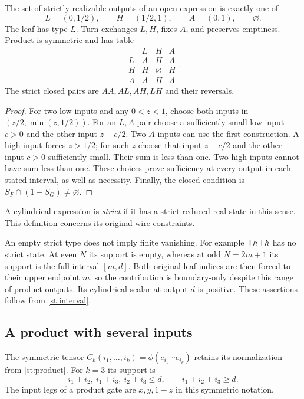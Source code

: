 \begin{lemma}\label{st:types}
The set of strictly realizable outputs of an open expression is
exactly one of
\[
 L=(0,1/2),\qquad H=(1/2,1),\qquad A=(0,1),\qquad\varnothing.
\]
The leaf has type $L$. Turn exchanges $L,H$, fixes $A$, and
preserves emptiness. Product is symmetric and has table
\[
 \begin{array}{c|ccc}
  &L&H&A\\\hline
 L&A&H&A\\
 H&H&\varnothing&H\\
 A&A&H&A
 \end{array}.
\]
The strict closed pairs are $AA,AL,AH,LH$ and their reversals.
\end{lemma}
\begin{proof}
For two low inputs and any $0<z<1$, choose both inputs in
$(z/2,\min(z,1/2))$. For an $L,A$ pair choose a sufficiently
small low input $c>0$ and the other input $z-c/2$.
Two $A$ inputs can use the first construction. A high input
forces $z>1/2$; for such $z$ choose that input $z-c/2$ and
the other input $c>0$ sufficiently small. Their sum is less
than one. Two high inputs cannot have sum less than one.
These choices prove sufficiency at every output in each stated
interval, as well as necessity. Finally, the closed condition is
$S_F\cap(1-S_G)\ne\varnothing$.
\end{proof}
\begin{definition}\label{st:strict-definition}
A cylindrical expression is \emph{strict} if it has a strict
reduced real state in this sense. This definition concerns its
original wire constraints.
\end{definition}
An empty strict type does not imply finite vanishing.
For example $\mathsf T h\,\mathsf T h$ has no strict state. At even $N$ its
support is empty, whereas at odd $N=2m+1$ its support
is the full interval $[m,d]$. Both original leaf
indices are then forced to their upper endpoint $m$,
so the contribution is boundary-only despite this
range of product outputs. Its cylindrical scalar
at output $d$ is positive. These assertions follow
from \eqref{st:interval}.

\subsection{A product with several inputs}
The symmetric tensor
$C_k(i_1,\ldots,i_k)=\phi(e_{i_1}\cdots e_{i_k})$
retains its normalization from \eqref{st:product}.
For $k=3$ its support is
\[
 i_1+i_2,\ i_1+i_3,\ i_2+i_3\le d,\qquad
 i_1+i_2+i_3\ge d.
\]
The input legs of a product gate are $x,y,1-z$ in this
symmetric notation.

